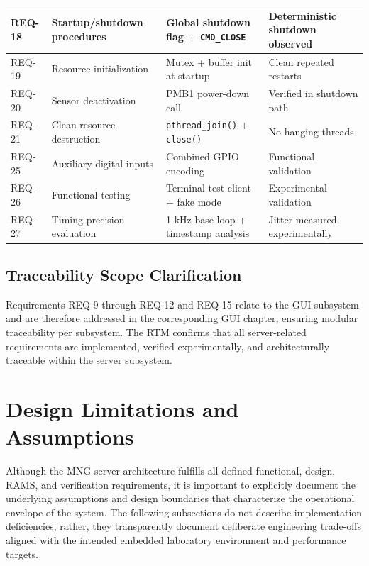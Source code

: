 \begin{landscape}
\begin{table}[p]
\begin{tabularx}{\linewidth}{|l|X|X|X|}
			\hline
			REQ-18 & Startup/shutdown procedures & Global shutdown flag + \texttt{CMD\_CLOSE} & Deterministic shutdown observed \\
			\hline
			REQ-19 & Resource initialization & Mutex + buffer init at startup & Clean repeated restarts \\
			\hline
			REQ-20 & Sensor deactivation & PMB1 power-down call & Verified in shutdown path \\
			\hline
			REQ-21 & Clean resource destruction & \texttt{pthread\_join()} + \texttt{close()} & No hanging threads \\
			\hline
			REQ-25 & Auxiliary digital inputs & Combined GPIO encoding & Functional validation \\
			\hline
			REQ-26 & Functional testing & Terminal test client + fake mode & Experimental validation \\
			\hline
			REQ-27 & Timing precision evaluation & 1 kHz base loop + timestamp analysis & Jitter measured experimentally \\
			\hline
			
		\end{tabularx}
	\end{table}
	
\end{landscape}
\clearpage

\subsection*{Traceability Scope Clarification}
Requirements REQ-9 through REQ-12 and REQ-15 relate to the GUI subsystem and are therefore addressed in the corresponding GUI chapter, ensuring modular traceability per subsystem. The RTM confirms that all server-related requirements are implemented, verified experimentally, and architecturally traceable within the server subsystem.

\section{Design Limitations and Assumptions}

Although the MNG server architecture fulfills all defined functional, design, RAMS, and verification requirements, it is important to explicitly document the underlying assumptions and design boundaries that characterize the operational envelope of the system. The following subsections do not describe implementation deficiencies; rather, they transparently document deliberate engineering trade-offs aligned with the intended embedded laboratory environment and performance targets.

